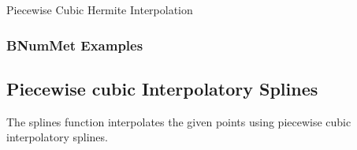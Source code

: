 \begin{algorithm}[H]
\medskip

\caption{Piecewise Cubic Hermite Interpolation}

\end{algorithm}

\subsubsection*{BNumMet Examples}


\subsection*{Piecewise cubic Interpolatory Splines}
The splines function interpolates the given points using piecewise cubic interpolatory splines.

